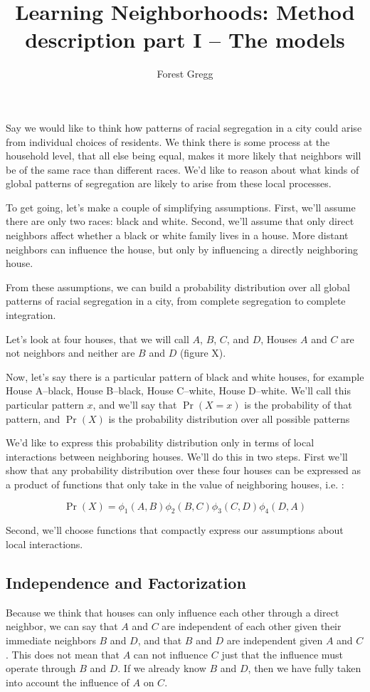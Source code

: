 \documentclass{article}
\title{Learning Neighborhoods: Method description part I -- The models}
\author{Forest Gregg}
\begin{document}
\maketitle
Say we would like to think how patterns of racial segregation in a
city could arise from individual choices of residents. We think there
is some process at the household level, that all else being equal,
makes it more likely that neighbors will be of the same race than
different races. We'd like to reason about what kinds of global patterns
of segregation are likely to arise from these local processes.

To get going, let's make a couple of simplifying assumptions. First,
we'll assume there are only two races: black and white. Second, we'll
assume that only direct neighbors affect whether a black or white
family lives in a house. More distant neighbors can influence the
house, but only by influencing a directly neighboring house.

From these assumptions, we can build a probability distribution over
all global patterns of racial segregation in a city, from complete
segregation to complete integration.


Let's look at four houses, that we will call $A$, $B$, $C$, and $D$,
Houses $A$ and $C$ are not neighbors and neither are $B$ and $D$ (figure X).

Now, let's say there is a particular pattern of black and white
houses, for example House A--black, House B--black, House C--white,
House D--white. We'll call this particular pattern $x$, and we'll say
that $\Pr(X=x)$ is the probability of that pattern, and $\Pr(X)$ is
the probability distribution over all possible patterns

We'd like to express this probability distribution only in terms of
local interactions between neighboring houses. We'll do this in two
steps. First we'll show that any probability distribution over these
four houses can be expressed as a product of functions that only take
in the value of neighboring houses, i.e. :

\begin{equation}
  \Pr(X) = \phi_1(A,B)\phi_2(B,C)\phi_3(C,D)\phi_4(D,A) 
\end{equation}

Second, we'll choose functions that compactly express our assumptions
about local interactions.

\subsection*{Independence and Factorization}
Because we think that houses can only influence each other through a
direct neighbor, we can say that $A$ and $C$ are independent of each
other given their immediate neighbors $B$ and $D$, and that $B$ and
$D$ are independent given $A$ and $C$. This does not mean that $A$ can
not influence $C$ just that the influence must operate through $B$ and
$D$. If we already know $B$ and $D$, then we have fully taken into
account the influence of $A$ on $C$.
\end{document}
